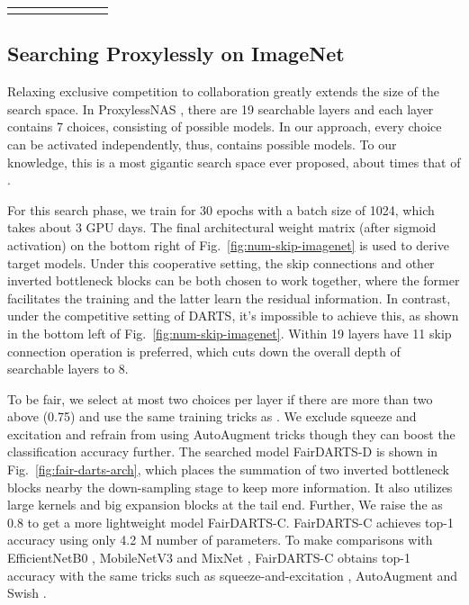 \documentclass[runningheads]{llncs}
\begin{document}
\begin{table}
\begin{center}
\begin{footnotesize}
\begin{tabular}{*{7}{l}}
\hline\noalign{\smallskip}
		\end{tabular}
		\end{footnotesize}
	\end{center}
\end{table}\setlength{\tabcolsep}{1.4pt}

\subsection{Searching Proxylessly on ImageNet}{\label{sec:proxyless}}


Relaxing exclusive competition to collaboration greatly extends the size of the search space. In ProxylessNAS \cite{cai2018proxylessnas}, there are 19 searchable layers and each layer contains 7 choices, consisting of  possible models. In our approach, every choice can be activated independently, thus,  contains  possible models. To our knowledge, this is a most gigantic search space ever proposed, about  times that of \cite{cai2018proxylessnas}. 

For this search phase, we train for 30 epochs with a batch size of 1024, which takes about 3 GPU days. The final architectural weight matrix (after sigmoid activation) on the bottom right of Fig.~\ref{fig:num-skip-imagenet} is used to derive target models. Under this cooperative setting, the skip connections and other inverted bottleneck blocks can be both chosen to work together, where the former facilitates the training and the latter learn the residual information\cite{li2017convergence}. In contrast, under the competitive setting of DARTS, it's impossible to achieve this, as shown in the bottom left of Fig.~\ref{fig:num-skip-imagenet}. Within 19 layers have 11 skip connection operation is preferred, which cuts down the overall depth of searchable layers to 8.



To be fair, we select at most two choices per layer if there are more than two  above  (0.75) and use the same training tricks as \cite{tan2018mnasnet}. We exclude squeeze and excitation \cite{hu2018squeeze} and refrain from using AutoAugment \cite{cubuk2018autoaugment} tricks though they can boost the classification accuracy further. The searched model FairDARTS-D is shown in Fig.~\ref{fig:fair-darts-arch}, which places the summation of two inverted bottleneck blocks nearby the down-sampling stage to keep more information. It also utilizes large kernels and big expansion blocks at the tail end. Further, We raise the  as 0.8 to get a more lightweight model FairDARTS-C. FairDARTS-C achieves  top-1 accuracy using only 4.2 M number of parameters. To make comparisons with EfficientNetB0 \cite{tan2019efficientnet}, MobileNetV3 \cite{howard2019searching} and MixNet \cite{tan2020mixconv}, FairDARTS-C obtains  top-1 accuracy with the same tricks such as squeeze-and-excitation \cite{hu2018squeeze}, AutoAugment \cite{cubuk2018autoaugment} and Swish \cite{ramachandran2017searching}.
\end{document}
